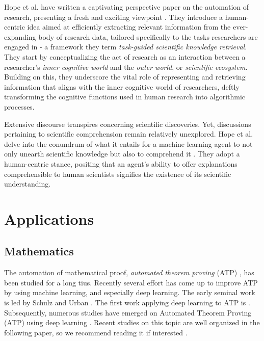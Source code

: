 \documentclass{book}
\begin{document}
Hope et al. have written a captivating perspective paper on the automation of research, presenting a fresh and exciting viewpoint \cite{hope2022computational}. They introduce a human-centric idea aimed at efficiently extracting relevant information from the ever-expanding body of research data, tailored specifically to the tasks researchers are engaged in - a framework they term \textit{task-guided scientific knowledge retrieval}. They start by conceptualizing the act of research as an interaction between a researcher's \textit{inner cognitive world} and the \textit{outer world}, or \textit{scientific ecosystem}. Building on this, they underscore the vital role of representing and retrieving information that aligns with the inner cognitive world of researchers, deftly transforming the cognitive functions used in human research into algorithmic processes.

Extensive discourse transpires concerning scientific discoveries. Yet, discussions pertaining to scientific comprehension remain relatively unexplored. Hope et al. delve into the conundrum of what it entails for a machine learning agent to not only unearth scientific knowledge but also to comprehend it \cite{krenn2022scientific}. They adopt a human-centric stance, positing that an agent's ability to offer explanations comprehensible to human scientists signifies the existence of its scientific understanding.

\section{Applications}

\subsection{Mathematics}
The automation of mathematical proof, \textit{automated theorem proving} (ATP) , has been studied for a long tius. Recently several effort has come up to improve ATP by using machine learning, and especially deep learning. The 
 early seminal work is led by Schulz \cite{schulz2001learning} and Urban \cite{urban2004mptp,urban2008malarea}. The first work applying deep learning to ATP is \cite{irving2016deepmath}. Subsequently, numerous studies have emerged on Automated Theorem Proving (ATP) using deep learning \cite{bansal2019holist}. Recent studies on this topic are well organized in the following paper, so we recommend reading it if interested \cite{rabe2021towards}.
\end{document}
